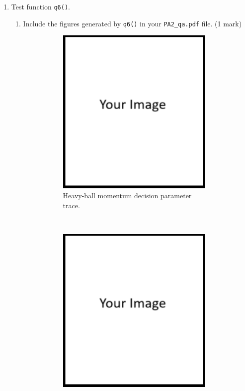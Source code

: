 \documentclass{article}
\theoremstyle{definition}
\newtheorem*{answer}{Answer}
\begin{document}
\begin{enumerate}[label=\ref{mom}.\alph*]
\begin{enumerate}[label=1.2.a.\roman*]
\begin{figure}[h]
\begin{subfigure}[t]{0.5\textwidth}
					\caption{Heavy-ball momentum Loss vs. iteration.}
				\end{subfigure}
				\caption{Figures generated by q5().}
			\end{figure}
		\item In 1-2 sentences, compare the performance of SGD with and without heavy-ball momentum by comparing the outcome of tests \verb|q3()| and \verb|q5()| (2 marks)
		\begin{answer}
			Your answer ...
		\end{answer}
	\end{enumerate}
	\newpage
	\item Test function \verb|q6()|.
	\begin{enumerate}[label=1.2.b.\roman*]
		\item Include the figures generated by \verb|q6()| in your \verb|PA2_qa.pdf| file. (1 mark)
		\begin{figure}[h]
			\centering
			\begin{subfigure}[t]{0.5\textwidth}
				\centering
				\includegraphics[height=3.2in]{image.png}
				\caption{Heavy-ball momentum decision parameter trace.}
			\end{subfigure}%
			~ 
			\begin{subfigure}[t]{0.5\textwidth}
				\centering
				\includegraphics[height=3.2in]{image.png}

\end{subfigure}
\end{figure}
\end{enumerate}
\end{enumerate}
\end{document}
